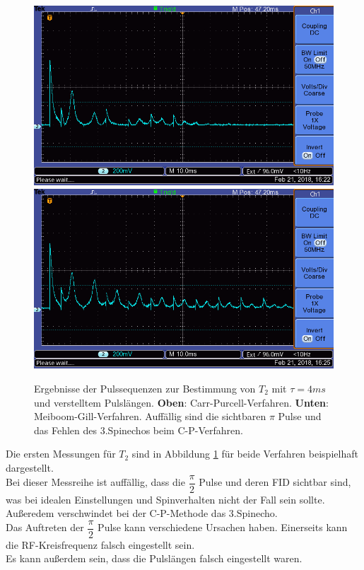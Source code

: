 \documentclass[12pt,a4paper]{article}
\begin{document}
\begin{figure}
\centering
\includegraphics[scale=0.8]{Bilder/T2CP.png}
\includegraphics[scale=0.8]{Bilder/T2MG.png}
\caption{Ergebnisse der Pulssequenzen zur Bestimmung von $T_2$ mit $\tau = 4ms$ und verstelltem Pulslängen. \textbf{Oben}: Carr-Purcell-Verfahren. \textbf{Unten}: Meiboom-Gill-Verfahren. Auffällig sind die sichtbaren $\pi$ Pulse und das Fehlen des 3.Spinechos beim C-P-Verfahren.}
\label{fig:T2Daten}
\end{figure}

Die ersten Messungen für $T_2$ sind in Abbildung \ref{fig:T2Daten} für beide Verfahren beispielhaft dargestellt.\\
Bei dieser Messreihe ist auffällig, dass die $\dfrac{\pi}{2}$ Pulse und deren FID sichtbar sind, was bei idealen Einstellungen und Spinverhalten nicht der Fall sein sollte. Außeredem verschwindet bei der C-P-Methode das 3.Spinecho.\\
Das Auftreten der $\dfrac{\pi}{2}$ Pulse kann verschiedene Ursachen haben. Einerseits kann die RF-Kreisfrequenz falsch eingestellt sein.\\
Es kann außerdem sein, dass die Pulslängen falsch eingestellt waren.
\end{document}
